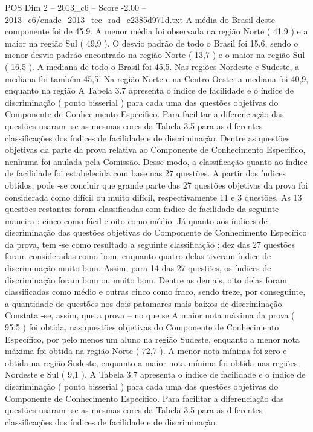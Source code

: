 \begin{textsample}{POS Dim 2 – 2013\_c6 – Score -2.00 – 2013\_c6/enade\_2013\_tec\_rad\_c2385d971d.txt}
A média do Brasil deste componente foi de 45,9.
A menor média foi observada na região Norte ( 41,9 ) e a maior na região Sul ( 49,9 ).
O desvio padrão de todo o Brasil foi 15,6, sendo o menor desvio padrão encontrado na região Norte ( 13,7 ) e o maior na região Sul ( 16,5 ).
A mediana de todo o Brasil foi 45,5.
Nas regiões Nordeste e Sudeste, a mediana foi também 45,5.
Na região Norte e na Centro-Oeste, a mediana foi 40,9, enquanto na região A Tabela 3.7 apresenta o índice de facilidade e o índice de discriminação ( ponto bisserial ) para cada uma das questões objetivas do Componente de Conhecimento Específico.
Para facilitar a diferenciação das questões usaram -se as mesmas cores da Tabela 3.5 para as diferentes classificações dos índices de facilidade e de discriminação.
Dentre as questões objetivas da parte da prova relativa ao Componente de Conhecimento Específico, nenhuma foi anulada pela Comissão.
Desse modo, a classificação quanto ao índice de facilidade foi estabelecida com base nas 27 questões.
A partir dos índices obtidos, pode -se concluir que grande parte das 27 questões objetivas da prova foi considerada como difícil ou muito difícil, respectivamente 11 e 3 questões.
As 13 questões restantes foram classificadas com índice de facilidade da seguinte maneira : cinco como fácil e oito como médio.
Já quanto aos índices de discriminação das questões objetivas do Componente de Conhecimento Específico da prova, tem -se como resultado a seguinte classificação : dez das 27 questões foram consideradas como bom, enquanto quatro delas tiveram índice de discriminação muito bom.
Assim, para 14 das 27 questões, os índices de discriminação foram bom ou muito bom.
Dentre as demais, oito delas foram classificadas como médio e outras cinco como fraco, sendo treze, por conseguinte, a quantidade de questões nos dois patamares mais baixos de discriminação.
Constata -se, assim, que a prova – no que se A maior nota máxima da prova ( 95,5 ) foi obtida, nas questões objetivas do Componente de Conhecimento Específico, por pelo menos um aluno na região Sudeste, enquanto a menor nota máxima foi obtida na região Norte ( 72,7 ).
A menor nota mínima foi zero e obtida na região Sudeste, enquanto a maior nota mínima foi obtida nas regiões Nordeste e Sul ( 9,1 ).
A Tabela 3.7 apresenta o índice de facilidade e o índice de discriminação ( ponto bisserial ) para cada uma das questões objetivas do Componente de Conhecimento Específico.
Para facilitar a diferenciação das questões usaram -se as mesmas cores da Tabela 3.5 para as diferentes classificações dos índices de facilidade e de discriminação.

\end{textsample}
